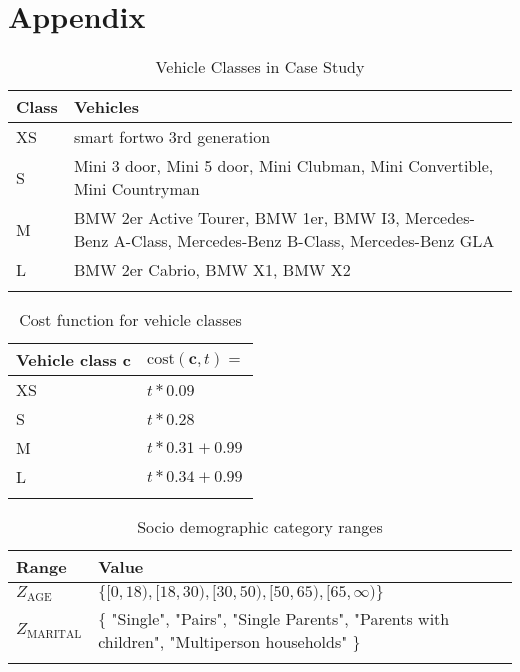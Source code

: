 \clearpage
\section{Appendix}
\label{app:A}

\begin{longtable}{ | l | p{12cm} |}
  \hline
  \textbf{Class} & \textbf{Vehicles} \\
  \hline
  XS & smart fortwo 3rd generation \\
  S & Mini 3 door, Mini 5 door, Mini Clubman, Mini Convertible,  Mini Countryman \\
  M & BMW 2er Active Tourer, BMW 1er, BMW I3, Mercedes-Benz A-Class, Mercedes-Benz B-Class, Mercedes-Benz GLA \\
  L & BMW 2er Cabrio, BMW X1, BMW X2 \\
  \hline

  \caption{Vehicle Classes in Case Study}
  \label{table:VehicleClasses}
\end{longtable}

\begin{longtable}{ | l | p{10cm} |}
  \hline
  Vehicle class \textbf{c} & $\text{cost}(\textbf{c}, t) = $ \\
  \hline
  XS & $t * 0.09$ \\
  S & $t * 0.28$ \\
  M & $t * 0.31 + 0.99$ \\
  L & $t * 0.34 + 0.99$ \\  
  \hline

  \caption{Cost function for vehicle classes}
  \label{table:CostFunction}
\end{longtable}


\begin{longtable}{ | l | p{10cm} |}
  \hline
  \textbf{Range} & \textbf{Value} \\
  \hline
  $Z_{\text{AGE}}$ & $\{ [0, 18), [18, 30), [30, 50), [50, 65), [65, \infty)  \}$ \\
  $Z_{\text{MARITAL}}$ & $\{$ "Single", "Pairs", "Single Parents", "Parents with children", "Multiperson households" $\}$ \\
  \hline

  \caption{Socio demographic category ranges}
  \label{table:Ranges}
\end{longtable}

